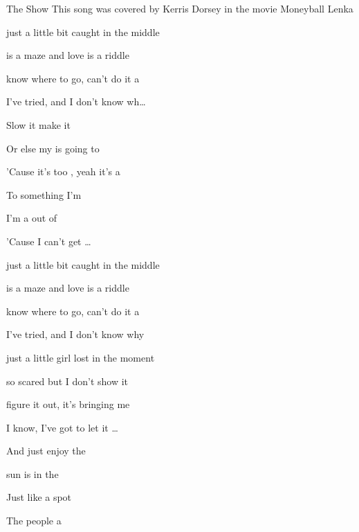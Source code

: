 \begin{SBSong}{The Show}
  {This song was covered by Kerris Dorsey in the movie Moneyball}
  {Lenka}
  \begin{SBVerse}
     just a little bit caught in the middle

     is a maze and love is a riddle

     know where to go, can't do it a

    I've tried, and I don't know wh\ldots{} 

    Slow it  make it  

    Or else my  is going to 

    'Cause it's too , yeah it's a  

    To  something I'm 

    I'm a  out of  
    
    'Cause I  can't get \ldots
  \end{SBVerse}
  \begin{SBVerse}
     just a little bit caught in the middle

     is a maze and love is a riddle

     know where to go, can't do it a

    I've tried, and I don't know why

     just a little girl lost in the moment

     so scared but I don't show it

     figure it out, it's bringing me 
    
    I know, I've got to let it \ldots {}

    And just enjoy the 
  \end{SBVerse}
  \begin{SBVerse}
     sun is  in the 
    
    Just like a  spot

    The people  a 


\end{SBVerse}
\end{SBSong}
